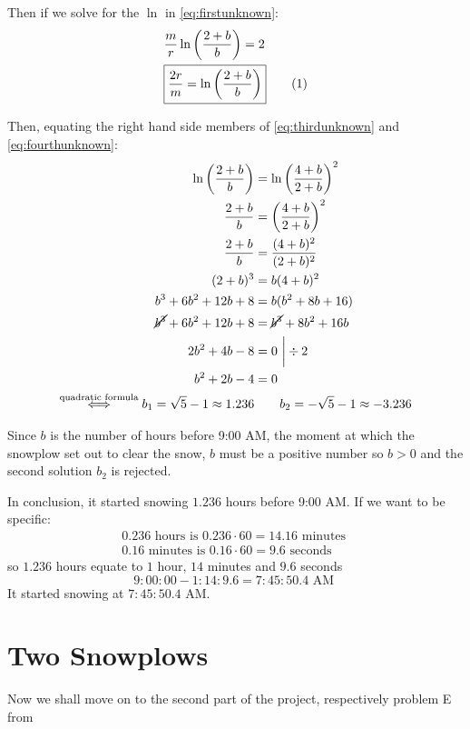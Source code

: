 \documentclass[a4paper,12pt]{article}
\renewcommand*{\textnormal}[1]{\text{ #1 }}
\newcommand\numberthis{\addtocounter{equation}{1}\tag{\theequation}}
\begin{document}
    Then if we solve for the $\ln$ in \eqref{eq:firstunknown}:
    \begin{align*}
        &\frac{m}{r} \ln\left(\frac{2+b}{b}\right) = 2 \\
        &\boxed{\frac{2r}{m} = \ln\left(\frac{2+b}{b}\right)} \numberthis \label{eq:fourthunknown}
    \end{align*}

    Then, equating the right hand side members of \eqref{eq:thirdunknown} and \eqref{eq:fourthunknown}:
    \begin{align*}
        \ln\left(\frac{2+b}{b}\right) &= \ln\left(\frac{4+b}{2+b}\right)^2 \\
        \frac{2+b}{b} &= \left(\frac{4+b}{2+b}\right)^2 \\
        \frac{2+b}{b} &= \frac{(4+b)^2}{(2+b)^2} \\
        (2+b)^3 &= b(4+b)^2 \\
        b^3 + 6b^2 + 12b + 8 &= b (b^2 + 8b + 16) \\
        \cancel{b^3} + 6b^2 + 12b + 8 &= \cancel{b^3} + 8b^2 + 16b \\
         2b^2 +  4b - 8 &= 0 \ \bigg| \div 2 \\ 
         b^2 + 2b - 4 &= 0 \\
         \overset{\text{quadratic formula}}{\iff} b_1 = \sqrt{5} - 1 \approx 1.236 &\qquad b_2 = -\sqrt 5 - 1 \approx - 3.236
    \end{align*}

    Since $b$ is the number of hours before 9:00 AM, the moment at which the snowplow set out to clear the snow, $b$ must be a positive number so $b >0$ and the second solution $b_2$ is rejected.

    In conclusion, it started snowing $1.236$ hours before 9:00 AM. If we want to be specific:
    \begin{align*}
        0.236 \textnormal{hours is} 0.236 \cdot 60 = 14.16 \textnormal{minutes} \\
        0.16 \textnormal{minutes is} 0.16 \cdot 60 = 9.6 \textnormal{seconds}
    \end{align*}
    so $1.236$ hours equate to $1$ hour, $14$ minutes and $9.6$ seconds
    \[
        9{:}00{:}00 - 1{:}14{:}9.6 = 7{:}45{:}50.4 \textnormal{AM}
    \]
   It started snowing at $7{:}45{:}50.4$ AM.

\setcounter{section}{0}
\part{Two Snowplows}
Now we shall move on to the second part of the project, respectively problem E from \cite[pp.~84--85]{Kent_Nagle2018-ig}
\end{document}

